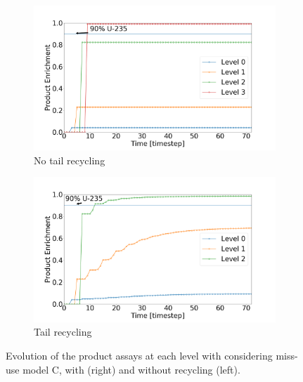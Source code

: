 \begin{figure}[t!]
    \centering
    \begin{subfigure}[t]{0.45\textwidth}
        \centering
        \includegraphics[scale=0.18]{NR_case3}
        \caption{No tail recycling}
    \end{subfigure}%
    \begin{subfigure}[t]{0.45\textwidth}
        \centering
        \includegraphics[scale=0.18]{R_case3}
        \caption{Tail recycling}
    \end{subfigure}
    \caption{Evolution of the product assays at each level with considering
    miss-use model C, with (right) and without recycling (left).}
    \label{fig:case3}
\end{figure}

